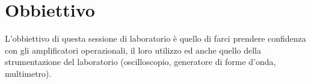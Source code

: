 \section*{Obbiettivo}

L'obbiettivo di questa sessione di laboratorio è quello di farci prendere confidenza con gli amplificatori operazionali, il loro utilizzo ed anche quello della strumentazione del laboratorio (oscilloscopio, generatore di forme d'onda, multimetro).

